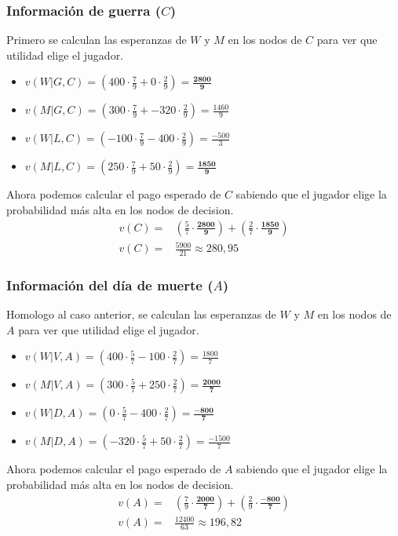 \documentclass[12pt]{article}
\begin{document}
\subsubsection{Información de guerra ($C$)}
Primero se calculan las esperanzas de $W$ y $M$ en los nodos de $C$ para ver que utilidad elige el jugador. \\
\begin{itemize}
    \item $v(W|G,C)=(400\cdot \frac{7}{9}+0\cdot \frac{2}{9})=\mathbf{\frac{2800}{9}}$
    \item $v(M|G,C)=(300\cdot \frac{7}{9}+-320\cdot \frac{2}{9})=\frac{1460}{9}$
    \item $v(W|L,C)=(-100\cdot \frac{7}{9}-400\cdot \frac{2}{9})=\frac{-500}{3}$
    \item $v(M|L,C)=(250\cdot \frac{7}{9}+50\cdot \frac{2}{9})=\mathbf{\frac{1850}{9}}$
\end{itemize}
Ahora podemos calcular el pago esperado de $C$ sabiendo que el jugador elige la probabilidad más alta en los nodos de decision. 
\begin{align*}
    v(C)=&(\frac{5}{7}\cdot \mathbf{\frac{2800}{9}})+(\frac{2}{7}\cdot\mathbf{\frac{1850}{9}})\\
    v(C)=& \frac{5900}{21}\approx 280,95
\end{align*}
\subsubsection{Información del día de muerte ($A$)}
Homologo al caso anterior, se calculan las esperanzas de $W$ y $M$ en los nodos de $A$ para ver que utilidad elige el jugador.
\begin{itemize}
    \item $v(W|V,A)=(400\cdot \frac{5}{7}-100\cdot \frac{2}{7})=\frac{1800}{7}$
    \item $v(M|V,A)=(300\cdot \frac{5}{7}+250\cdot \frac{2}{7})=\mathbf{\frac{2000}{7}}$
    \item $v(W|D,A)=(0\cdot \frac{5}{7}-400\cdot \frac{2}{7})=\mathbf{\frac{-800}{7}}$
    \item $v(M|D,A)=(-320\cdot \frac{5}{7}+50\cdot \frac{2}{7})=\frac{-1500}{7}$
\end{itemize}
Ahora podemos calcular el pago esperado de $A$ sabiendo que el jugador elige la probabilidad más alta en los nodos de decision. 
\begin{align*}
    v(A)=&(\frac{7}{9}\cdot \mathbf{\frac{2000}{7}})+(\frac{2}{9}\cdot\mathbf{\frac{-800}{7}})\\
    v(A)=& \frac{12400}{63}\approx 196,82
\end{align*}
\end{document}
